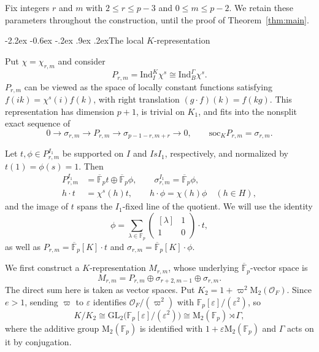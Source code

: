 \documentclass[10pt]{article}
\makeatletter
\renewcommand\subsection{\@startsection{subsection}{2}{\z@}%
  {-2.2ex \@plus -0.6ex \@minus -.2ex}%
  {.9ex \@plus .2ex}{\normalfont\large\bfseries}}
\theoremstyle{plain}
\theoremstyle{definition}
\theoremstyle{remark}
\newcommand{\Fp}{\mathbb{F}_p}
\newcommand{\Fpbar}{\overline{\mathbb{F}}_p}
\newcommand{\GL}{\mathrm{GL}}
\newcommand{\Ind}{\mathrm{Ind}}
\newcommand{\Mat}{\mathrm{M}}
\newcommand{\soc}{\mathrm{soc}}
\makeatother
\begin{document}
Fix integers $r$ and $m$ with $2\leq r\leq p-3$ and $0\leq m\leq p-2$. We retain these parameters throughout the construction, until the proof of Theorem~\ref{thm:main}.

\subsection{The local \texorpdfstring{$K$}{K}-representation}

Put $\chi=\chi_{r,m}$ and consider
\[
P_{r,m}=\Ind_I^K\chi^s\cong\Ind_B^\Gamma\chi^s.
\]
$P_{r,m}$ can be viewed as the space of locally constant functions satisfying $f(ik)=\chi^s(i)f(k)$, with right translation $(g\cdot f)(k)=f(kg)$. This representation has dimension $p+1$, is trivial on $K_1$, and fits into the nonsplit exact sequence of~\cite[Theorem~2.4]{BP12} 
\begin{equation}\label{eq:principal-series-extension}
0\longrightarrow\sigma_{r,m}\longrightarrow P_{r,m}
\longrightarrow\sigma_{p-1-r,m+r}\longrightarrow0,
\qquad \soc_K P_{r,m}=\sigma_{r,m}.
\end{equation}

Let $t,\phi\in P_{r,m}^{I_1}$ be supported on $I$ and $IsI_1$, respectively, and normalized by $t(1)=\phi(s)=1$. Then
\begin{equation}\label{eq:principal-series-invariants}
\begin{aligned}
P_{r,m}^{I_1}&=\Fpbar t\oplus\Fpbar\phi,
\qquad \sigma_{r,m}^{I_1}=\Fpbar\phi,\\
h\cdot t&=\chi^s(h)t,\qquad
h\cdot\phi=\chi(h)\phi\quad(h\in H),
\end{aligned}
\end{equation}
and the image of $t$ spans the $I_1$-fixed line of the quotient. We will use the identity
\begin{equation}\label{eq:principal-series-t-to-phi}
\phi=\sum_{\lambda\in\Fp}
\begin{pmatrix}[\lambda]&1\\1&0\end{pmatrix}\cdot t,
\end{equation}
as well as $P_{r,m}=\Fpbar[K]\cdot t$ and $\sigma_{r,m}=\Fpbar[K]\cdot\phi$.

We first construct a $K$-representation $M_{r,m}$, whose underlying $\Fpbar$-vector space is
\begin{equation}\label{eq:module-M-vector-space}
M_{r,m}=P_{r,m}\oplus\sigma_{r+2,m-1}\oplus\sigma_{r,m}.
\end{equation}
The direct sum here is taken as vector spaces. Put $K_2=1+\varpi^2\Mat_2(\mathcal{O}_F)$. Since $e>1$, sending $\varpi$ to $\varepsilon$ identifies $\mathcal{O}_F/(\varpi^2)$ with $\Fp[\varepsilon]/(\varepsilon^2)$, so
\[
K/K_2\cong\GL_2\bigl(\Fp[\varepsilon]/(\varepsilon^2)\bigr)
\cong\Mat_2(\Fp)\rtimes\Gamma,
\]
where the additive group $\Mat_2(\Fp)$ is identified with $1+\varepsilon\Mat_2(\Fp)$ and $\Gamma$ acts on it by conjugation.
\end{document}

